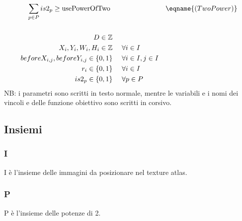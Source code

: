 \begin{align*}
\sum_{p \in P} is2_p \geq \text{usePowerOfTwo}       \ \ \ \ \   & & \eqname{(TwoPower)} \\
\\
%
%
%
%
%
D \in \IntegerSet \ \ \ \ & & \\
X_i, Y_i, W_i, H_i \in \IntegerSet      \ \ \ \ & \fori{} \\
beforeX_{i,j}, beforeY_{i,j} \in \BinSet    \ \ \ \ & \forall{i \in I,j \in I} \\
%
r_i \in \BinSet \ \ \ \ & \fori{} \\
%
is2_p \in \BinSet \ \ \ \ & \forall{p \in P} \\
%
%
%
 \end{align*}
NB: i parametri sono scritti in testo normale, mentre le variabili e i nomi dei vincoli e delle funzione obiettivo sono scritti in corsivo.




\iffalse
Changelog del modello

Il modello è passato per più fasi incrementali:
* La prima versione risolve il problema base
* Quindi è stato aggiunto il supporto per il bleeding
* La terza versione ha aggiunto la possibilità di ruotare le immagini
* La quarta e ultima versione permette di fissare la dimensione della texture atlas a potenze di 2
\fi





\subsection{Insiemi}
\subsubsection{I}
I è l'insieme delle immagini da posizionare nel texture atlas.

\subsubsection{P}
P è l'insieme delle potenze di 2.





\newcommand{\footBleeding}{L'effetto bleeding si può manifestare nei programmi che sfruttano l'accelerazione hardware. In essi i pixel vengono presi con delle coordinate reali in [0,1] e i pixel subito fuori dall'immagine possono "sporcare" quelli di contorno. Perciò si ricopiano questi ultimi in un bordo di 1 pixel attorno a tutta l'immagine.}
\newcommand{\footRotation}{Alcuni programmi (soprattutto quelli che sfruttano l'accelerazione hardware) possono renderizzare le texture in modo giusto ache se sull'immagine originaria sono ruotate, mentre altri potrebbero avere problemi.}
\newcommand{\footTwoPowers}{Alcune librerie spesso esigono immagini quadrate il cui lato dev'essere una potenza di 2.}

